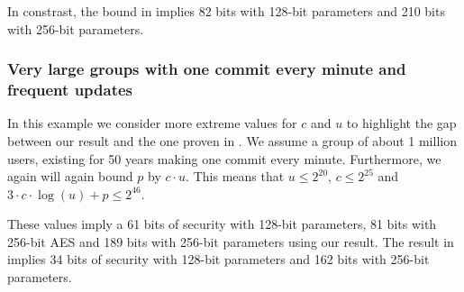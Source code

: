 In constrast, the bound in \cite{ttkem} implies 82 bits with 128-bit parameters and 210 bits with 256-bit parameters.

\subsubsection{Very large groups with one commit every minute and frequent updates} In this example we consider more extreme values for $c$ and $u$ to highlight the gap between our result and the one proven in \cite{ttkem}. We assume a group of about 1 million users, existing for 50 years making one commit every minute. Furthermore, we again will again bound $p$ by $c \cdot u$. This means that $u \le 2^{20}$, $c \le 2^{25}$ and $3 \cdot c \cdot \log(u) + p \le 2^{46}$.

These values imply a 61 bits of security with 128-bit parameters, 81 bits with 256-bit AES and 189 bits with 256-bit parameters using our result. The result in \cite{ttkem} implies 34 bits of security with 128-bit parameters and 162 bits with 256-bit parameters.
